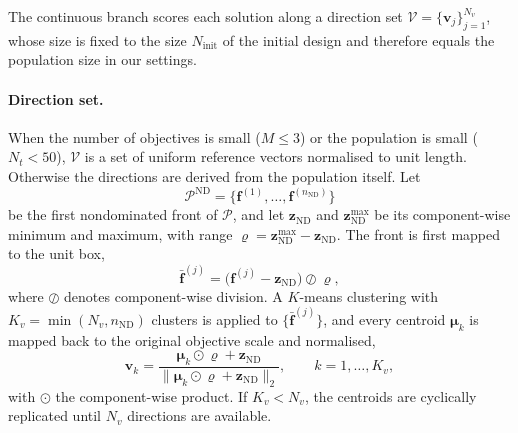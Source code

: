 \documentclass[11pt,a4paper]{article}
\newcommand{\vf}{\mathbf{f}}
\newcommand{\vv}{\mathbf{v}}
\newcommand{\vz}{\mathbf{z}}
\begin{document}
The continuous branch scores each solution along a direction set
$\mathcal{V}=\{\vv_j\}_{j=1}^{N_v}$, whose size is fixed to the size
$N_{\mathrm{init}}$ of the initial design and therefore equals the population
size in our settings.

\paragraph{Direction set.}
When the number of objectives is small ($M\leq3$) or the population is small
($N_t<50$), $\mathcal{V}$ is a set of uniform reference vectors normalised to
unit length. Otherwise the directions are derived from the population itself.
Let
\begin{equation}
\mathcal{P}^{\mathrm{ND}}
=\bigl\{\vf^{(1)},\ldots,\vf^{(n_{\mathrm{ND}})}\bigr\}
\label{eq:ndset}
\end{equation}
be the first nondominated front of $\mathcal{P}$, and let $\vz_{\mathrm{ND}}$
and $\vz_{\mathrm{ND}}^{\max}$ be its component-wise minimum and maximum, with
range $\bm{\varrho}=\vz_{\mathrm{ND}}^{\max}-\vz_{\mathrm{ND}}$. The front is
first mapped to the unit box,
\begin{equation}
\bar{\vf}^{(j)}
=\bigl(\vf^{(j)}-\vz_{\mathrm{ND}}\bigr)\oslash\bm{\varrho},
\label{eq:ndnorm}
\end{equation}
where $\oslash$ denotes component-wise division. A $K$-means clustering with
$K_v=\min(N_v,n_{\mathrm{ND}})$ clusters is applied to
$\{\bar{\vf}^{(j)}\}$, and every centroid $\bm{\mu}_k$ is mapped back to the
original objective scale and normalised,
\begin{equation}
\vv_k=\frac{\bm{\mu}_k\odot\bm{\varrho}+\vz_{\mathrm{ND}}}
{\bigl\|\bm{\mu}_k\odot\bm{\varrho}+\vz_{\mathrm{ND}}\bigr\|_2},
\qquad k=1,\ldots,K_v,
\label{eq:direction}
\end{equation}
with $\odot$ the component-wise product. If $K_v<N_v$, the centroids are
cyclically replicated until $N_v$ directions are available.
\end{document}
